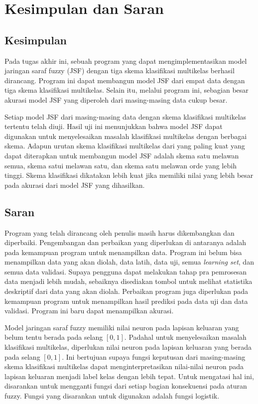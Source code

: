 \vspace{15cm}
\chapter{Kesimpulan dan Saran} \label{bab konklusi}

\section{Kesimpulan}
\noindent Pada tugas akhir ini, sebuah program yang dapat mengimplementasikan model jaringan saraf fuzzy (JSF) dengan tiga skema klasifikasi multikelas berhasil dirancang. Program ini dapat membangun model JSF dari empat data dengan tiga skema klasifikasi multikelas. Selain itu, melalui program ini, sebagian besar akurasi model JSF yang diperoleh dari masing-masing data cukup besar.

\noindent Setiap model JSF dari masing-masing data dengan skema klasifikasi multikelas tertentu telah diuji. Hasil uji ini menunjukkan bahwa model JSF dapat digunakan untuk menyelesaikan masalah klasifikasi multikelas dengan berbagai skema. Adapun urutan skema klasifikasi multikelas dari yang paling kuat yang dapat diterapkan untuk membangun model JSF adalah skema satu melawan semua, skema satui melawan satu, dan skema satu melawan orde yang lebih tinggi. Skema klasifikasi dikatakan lebih kuat jika memiliki nilai yang lebih besar pada akurasi dari model JSF yang dihasilkan.

\section{Saran}
\noindent Program yang telah dirancang oleh penulis masih harus dikembangkan dan diperbaiki. Pengembangan dan perbaikan yang diperlukan di antaranya adalah pada kemampuan program untuk menampilkan data. Program ini belum bisa menampilkan data yang akan diolah, data latih, data uji, semua \emph{learning set}, dan semua data validasi. Supaya pengguna dapat melakukan tahap pra pemrosesan data menjadi lebih mudah, sebaiknya disediakan tombol untuk melihat statistika deskriptif dari data yang akan diolah. Perbaikan program juga diperlukan pada kemampuan program untuk menampilkan hasil prediksi pada data uji dan data validasi. Program ini baru dapat menampilkan akurasi.

\noindent

\noindent Model jaringan saraf fuzzy memiliki nilai neuron pada lapisan keluaran yang belum tentu berada pada selang $[0,1]$. Padahal untuk menyelesaikan masalah klasifikasi multikelas, diperlukan nilai neuron pada lapisan keluaran yang berada pada selang $[0,1]$. Ini bertujuan supaya fungsi keputusan dari masing-masing skema klasifikasi multikelas dapat menginterpretasikan nilai-nilai neuron pada lapisan keluaran menjadi label kelas dengan lebih tepat. Untuk mengatasi hal ini, disarankan untuk mengganti fungsi dari setiap bagian konsekuensi pada aturan fuzzy. Fungsi yang disarankan untuk digunakan adalah fungsi logistik.